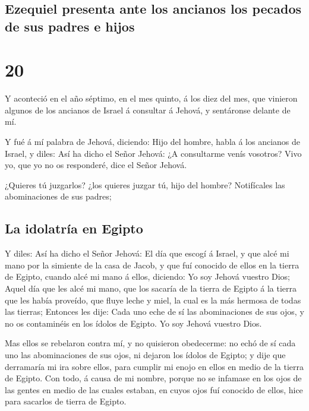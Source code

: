 \hypertarget{ezequiel-presenta-ante-los-ancianos-los-pecados-de-sus-padres-e-hijos}{%
\subsection{Ezequiel presenta ante los ancianos los pecados de sus
padres e
hijos}\label{ezequiel-presenta-ante-los-ancianos-los-pecados-de-sus-padres-e-hijos}}

\hypertarget{section-26-20}{%
\section{20}\label{section-26-20}}

 Y aconteció en el año séptimo, en el mes quinto, á los
diez del mes, que vinieron algunos de los ancianos de Israel á consultar
á Jehová, y sentáronse delante de mí.

 Y fué á mí palabra de Jehová, diciendo: 
Hijo del hombre, habla á los ancianos de Israel, y diles: Así ha dicho
el Señor Jehová: ¿A consultarme venís vosotros? Vivo yo, que yo no os
responderé, dice el Señor Jehová.

 ¿Quieres tú juzgarlos? ¿los quieres juzgar tú, hijo del
hombre? Notifícales las abominaciones de sus padres;

\hypertarget{la-idolatruxeda-en-egipto}{%
\subsection{La idolatría en Egipto}\label{la-idolatruxeda-en-egipto}}

 Y diles: Así ha dicho el Señor Jehová: El día que escogí
á Israel, y que alcé mi mano por la simiente de la casa de Jacob, y que
fuí conocido de ellos en la tierra de Egipto, cuando alcé mi mano á
ellos, diciendo: Yo soy Jehová vuestro Dios;  Aquel día
que les alcé mi mano, que los sacaría de la tierra de Egipto á la tierra
que les había proveído, que fluye leche y miel, la cual es la más
hermosa de todas las tierras;  Entonces les dije: Cada uno
eche de sí las abominaciones de sus ojos, y no os contaminéis en los
ídolos de Egipto. Yo soy Jehová vuestro Dios.

 Mas ellos se rebelaron contra mí, y no quisieron
obedecerme: no echó de sí cada uno las abominaciones de sus ojos, ni
dejaron los ídolos de Egipto; y dije que derramaría mi ira sobre ellos,
para cumplir mi enojo en ellos en medio de la tierra de Egipto.
 Con todo, á causa de mi nombre, porque no se infamase en
los ojos de las gentes en medio de las cuales estaban, en cuyos ojos fuí
conocido de ellos, hice para sacarlos de tierra de Egipto.

